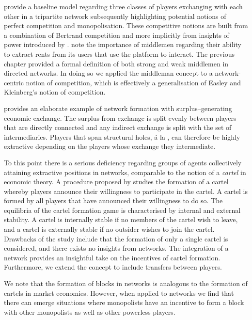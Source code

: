 \citet{EasleyKleinberg2010} provide a baseline model regarding three classes of players exchanging with each other in a tripartite network subsequently highlighting potential notions of perfect competition and monopolisation. These competitive notions are built from a combination of Bertrand competition and more implicitly from insights of power introduced by \citet{Emerson1962}. \citet{GillesDiamantaris2013} note the importance of middlemen regarding their ability to extract rents from its users that use the platform to interact. The previous chapter provided a formal definition of both strong and weak middlemen in directed networks. In doing so we applied the middleman concept to a network-centric notion of competition, which is effectively a generalisation of Easley and Kleinberg's notion of competition.

\citet{GoyalVega-holes} provides an elaborate example of network formation with surplus--generating economic exchange. The surplus from exchange is split evenly between players that are directly connected and any indirect exchange is split with the set of intermediaries. Players that span structural holes, \'{a} la \citet{Burt1992}, can therefore be highly extractive depending on the players whose exchange they intermediate.

To this point there is a serious deficiency regarding groups of agents collectively attaining extractive positions in networks, comparable to the notion of a \emph{cartel} in economic theory. A procedure proposed by \citet{Aspremont1983} studies the formation of a cartel whereby players announce their willingness to participate in the cartel. A cartel is formed by all players that have announced their willingness to do so. The equilibria of the cartel formation game is characterised by internal and external stability. A cartel is internally stable if no members of the cartel wish to leave, and a cartel is externally stable if no outsider wishes to join the cartel. Drawbacks of the study include that the formation of only a single cartel is considered, and there exists no insights from networks. The integration of a network provides an insightful take on the incentives of cartel formation. Furthermore, we extend the concept to include transfers between players.

We note that the formation of blocks in networks is analogous to the formation of cartels in market economies. However, when applied to networks we find that there can emerge situations where monopolists have an incentive to form a block with other monopolists as well as other powerless players.

